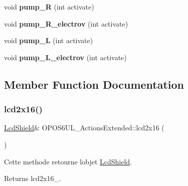 \begin{DoxyCompactItemize}
void {\bfseries pump\+\_\+R} (int activate)
\item 
\mbox{\label{classOPOS6UL__ActionsExtended_aaea62e26adafcbcc031fbc7062ad8ac5}} 
void {\bfseries pump\+\_\+\+R\+\_\+electrov} (int activate)
\item 
\mbox{\label{classOPOS6UL__ActionsExtended_ad8414373914bc8266c60c2329a97f4c5}} 
void {\bfseries pump\+\_\+L} (int activate)
\item 
\mbox{\label{classOPOS6UL__ActionsExtended_aeeb0611f5288edaad9295dc49d223ad8}} 
void {\bfseries pump\+\_\+\+L\+\_\+electrov} (int activate)
\end{DoxyCompactItemize}


\subsection{Member Function Documentation}
\mbox{\label{classOPOS6UL__ActionsExtended_a92c4b04808832f55fa7b68a9678307b1}} 
\subsubsection{\texorpdfstring{lcd2x16()}{lcd2x16()}}
{\footnotesize\ttfamily \hyperlink{classLcdShield}{Lcd\+Shield}\& O\+P\+O\+S6\+U\+L\+\_\+\+Actions\+Extended\+::lcd2x16 (\begin{DoxyParamCaption}{ }\end{DoxyParamCaption})\hspace{0.3cm}{\ttfamily [inline]}}



Cette methode retourne l\textquotesingle{}objet \hyperlink{classLcdShield}{Lcd\+Shield}. 

\begin{DoxyReturn}{Returns}
lcd2x16\+\_\+. 
\end{DoxyReturn}
\mbox{\label{classOPOS6UL__ActionsExtended_a45cbc8df7fe022adea06aa127b94069c}} 
